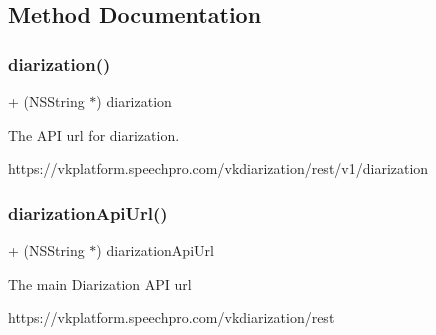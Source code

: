 \subsection{Method Documentation}
\hypertarget{interface_s_t_c_d_r_z_u_r_l_manager_ac80a6da75efd4d33240e05258695ace5}{}\label{interface_s_t_c_d_r_z_u_r_l_manager_ac80a6da75efd4d33240e05258695ace5} 
\subsubsection{\texorpdfstring{diarization()}{diarization()}}
{\footnotesize\ttfamily + (N\+S\+String $\ast$) diarization \begin{DoxyParamCaption}{ }\end{DoxyParamCaption}}

The A\+PI url for diarization. 
\begin{DoxyCode}
https:\textcolor{comment}{//vkplatform.speechpro.com/vkdiarization/rest/v1/diarization}
\end{DoxyCode}
 \hypertarget{interface_s_t_c_d_r_z_u_r_l_manager_a013f98a5dd0acc40f6dbc84e99870721}{}\label{interface_s_t_c_d_r_z_u_r_l_manager_a013f98a5dd0acc40f6dbc84e99870721} 
\subsubsection{\texorpdfstring{diarization\+Api\+Url()}{diarizationApiUrl()}}
{\footnotesize\ttfamily + (N\+S\+String $\ast$) diarization\+Api\+Url \begin{DoxyParamCaption}{ }\end{DoxyParamCaption}}

The main Diarization A\+PI url 
\begin{DoxyCode}
https:\textcolor{comment}{//vkplatform.speechpro.com/vkdiarization/rest}
\end{DoxyCode}
 \hypertarget{interface_s_t_c_d_r_z_u_r_l_manager_a7bbb9e68627b4a51457869d43193bc26}{}\label{interface_s_t_c_d_r_z_u_r_l_manager_a7bbb9e68627b4a51457869d43193bc26} 
